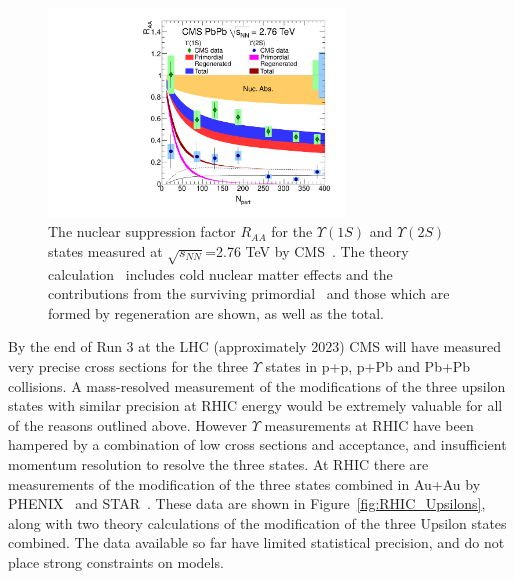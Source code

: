 	
\begin{figure}[!htb]
\centerline{
\includegraphics[width=0.7\textwidth]{fig/CMS_Upsilon_RAA_Rapp_theory}
}
\caption[CMS measurements of $\Upsilon$ production compared to theory]{The nuclear suppression factor $R_{AA}$ for the $\Upsilon(1S)$ and $\Upsilon(2S)$ states measured at $\sqrt{s_{NN}}$=2.76 TeV
by CMS~\cite{Chatrchyan:2012lxa}. The theory calculation~\cite{Emerick:2011xu} includes cold nuclear matter effects
and the contributions from the surviving primordial \Jpsi\ and those which are formed by regeneration are shown, as well
as the total.
}
\label{fig:CMS_Upsilons}
\end{figure}
	
	
By the end of Run 3 at
the LHC (approximately 2023) CMS will have measured very precise cross sections for the three
$\Upsilon$ states in p+p, p+Pb and Pb+Pb collisions. A mass-resolved measurement of the modifications
of the three upsilon states with similar precision at RHIC energy would be extremely valuable for all of
the reasons outlined above. However $\Upsilon$ measurements at RHIC have been hampered by a
combination of low cross sections and acceptance, and insufficient momentum resolution to resolve the
three states. At RHIC there are measurements of the modification of the three states
combined in Au+Au by PHENIX~\cite{Adare:2014hje} and STAR~\cite{Adamczyk:2013poh}. These data
are shown in Figure~\ref{fig:RHIC_Upsilons}, along with two theory
calculations\cite{Emerick:2011xu,Strickland:2011aa} of the modification of the three Upsilon states combined.
The data available so far have limited statistical precision, and do not place strong constraints on models.
	
